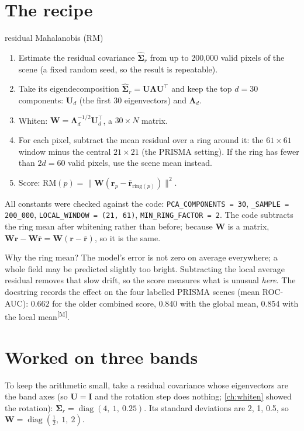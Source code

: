 \documentclass[11pt,a4paper,oneside,openany]{book}
\newcommand{\B}[1]{{\symbf{#1}}}
\newcommand{\B}[1]{{\bm{#1}}}
\newcommand{\meas}{\textsuperscript{\textsf{\scriptsize[M]}}}
\newcommand{\T}{^{\top}}
\newcommand{\nrm}[1]{\lVert #1\rVert}
\newcommand{\vr}{\B{r}}
\newcommand{\mW}{\B{W}}
\newcommand{\mU}{\B{U}}
\newcommand{\mI}{\B{I}}
\newcommand{\mLam}{\B{\Lambda}}
\newcommand{\mSig}{\B{\Sigma}}
\begin{document}
\section{The recipe}

\begin{defn}{residual Mahalanobis (RM)}
\begin{enumerate}
\item Estimate the residual covariance $\hat{\mSig}_r$ from up to 200{,}000 valid pixels of the scene (a fixed random seed, so the result is
  repeatable).
\item Take its eigendecomposition $\hat{\mSig}_r=\mU\mLam\mU\T$ and keep the top $d=30$ components: $\mU_d$ (the first 30 eigenvectors)
  and $\mLam_d$.
\item Whiten: $\mW=\mLam_d^{-1/2}\mU_d\T$, a $30\times N$ matrix.
\item For each pixel, subtract the mean residual over a ring around it: the $61\times61$ window minus the central $21\times21$ (the
  PRISMA setting). If the ring has fewer than $2d=60$ valid pixels, use the scene mean instead.
\item Score: $\mathrm{RM}(p)=\nrm{\mW(\vr_p-\bar{\vr}_{\text{ring}(p)})}^2$.
\end{enumerate}
\end{defn}

All constants were checked against the code: \texttt{PCA\_COMPONENTS = 30}, \texttt{\_SAMPLE = 200\_000},
\texttt{LOCAL\_WINDOW = (21, 61)}, \texttt{MIN\_RING\_FACTOR = 2}. The code subtracts the ring mean after whitening rather than before;
because $\mW$ is a matrix, $\mW\vr-\mW\bar{\vr}=\mW(\vr-\bar{\vr})$, so it is the same.

Why the ring mean? The model's error is not zero on average everywhere; a whole field may be predicted slightly too bright. Subtracting
the local average residual removes that slow drift, so the score measures what is unusual \emph{here}. The docstring records the
effect on the four labelled PRISMA scenes (mean ROC-AUC): $0.662$ for the older combined score, $0.840$ with the global mean, $0.854$ with
the local mean\meas.

\section{Worked on three bands}

To keep the arithmetic small, take a residual covariance whose eigenvectors are the band axes (so $\mU=\mI$ and the rotation step does
nothing; \cref{ch:whiten} showed the rotation): $\mSig_r=\operatorname{diag}(4,\ 1,\ 0.25)$. Its standard deviations are 2, 1, 0.5,
so $\mW=\operatorname{diag}(\tfrac12,\ 1,\ 2)$.
\end{document}
